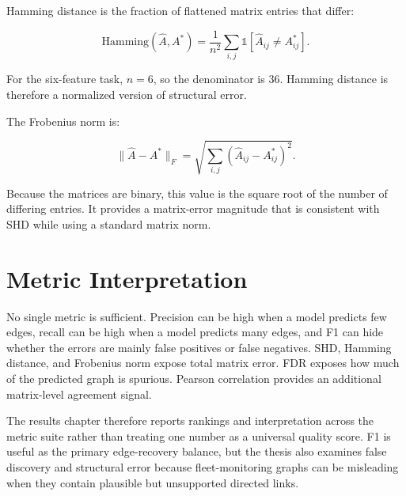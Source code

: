 Hamming distance is the fraction of flattened matrix entries that differ:

\begin{equation}
  \mathrm{Hamming}(\hat{A},A^\ast) =
  \frac{1}{n^2}\sum_{i,j}\mathbb{1}[\hat{A}_{ij} \neq A^\ast_{ij}].
\end{equation}

For the six-feature task, \(n=6\), so the denominator is 36. Hamming distance
is therefore a normalized version of structural error.

The Frobenius norm is:

\begin{equation}
  \lVert \hat{A}-A^\ast\rVert_F =
  \sqrt{\sum_{i,j}(\hat{A}_{ij}-A^\ast_{ij})^2}.
\end{equation}

Because the matrices are binary, this value is the square root of the number
of differing entries. It provides a matrix-error magnitude that is consistent
with SHD while using a standard matrix norm.

\section{Metric Interpretation}

No single metric is sufficient. Precision can be high when a model predicts
few edges, recall can be high when a model predicts many edges, and F1 can
hide whether the errors are mainly false positives or false negatives. SHD,
Hamming distance, and Frobenius norm expose total matrix error. FDR exposes
how much of the predicted graph is spurious. Pearson correlation provides an
additional matrix-level agreement signal.

The results chapter therefore reports rankings and interpretation across the
metric suite rather than treating one number as a universal quality score. F1
is useful as the primary edge-recovery balance, but the thesis also examines
false discovery and structural error because fleet-monitoring graphs can be
misleading when they contain plausible but unsupported directed links.
